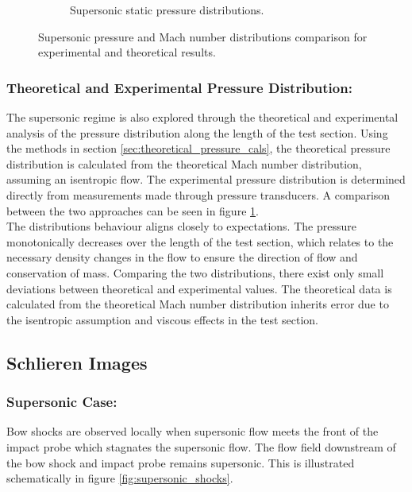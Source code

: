 \documentclass[runningheads]{llncs}
\begin{document}
\begin{figure}[h]
\begin{subfigure}{0.49\textwidth}
    \caption{Supersonic static pressure distributions.}
    \label{fig:supersonic_pressure_comp}
    \end{subfigure}
    \caption{Supersonic pressure and Mach number distributions comparison for experimental and theoretical results.}
    \label{fig:supersonic_comp}
\end{figure}

\subsubsection{Theoretical and Experimental Pressure Distribution:}

The supersonic regime is also explored through the theoretical and experimental analysis of the pressure distribution along the length of the test section. Using the methods in section \ref{sec:theoretical_pressure_cals}, the theoretical pressure distribution is calculated from the theoretical Mach number distribution, assuming an isentropic flow. The experimental pressure distribution is determined directly from measurements made through pressure transducers. A comparison between the two approaches can be seen in figure \ref{fig:supersonic_pressure_comp}.\\

\noindent
The distributions behaviour aligns closely to expectations. The pressure monotonically decreases over the length of the test section, which relates to the necessary density changes in the flow to ensure the direction of flow and conservation of mass. Comparing the two distributions, there exist only small deviations between theoretical and experimental values. The theoretical data is calculated from the theoretical Mach number distribution inherits error due to the isentropic assumption and viscous effects in the test section.

\subsection{Schlieren Images}

\subsubsection{Supersonic Case:}

Bow shocks are observed locally when supersonic flow meets the front of the impact probe which stagnates the supersonic flow. The flow field downstream of the bow shock and impact probe remains supersonic. This is illustrated schematically in figure \ref{fig:supersonic_shocks}.\\
\end{document}
